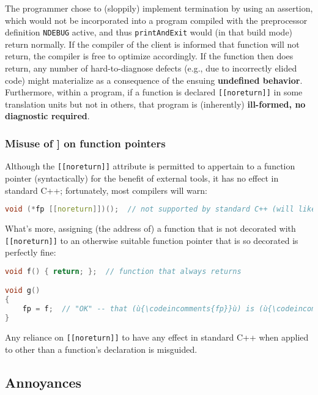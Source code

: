 \noindent The programmer chose to (sloppily) implement termination by using an
assertion, which would not be incorporated into a program compiled with
the preprocessor definition \texttt{NDEBUG} active, and thus
\texttt{printAndExit} would (in that build mode) return normally. If the
compiler of the client is informed that function will not return, the compiler is
free to optimize accordingly. If the function then does return, any
number of hard-to-diagnose defects (e.g., due to incorrectly elided
code) might materialize as a consequence of the ensuing
\textbf{undefined behavior}. Furthermore, within a program, if a function is declared \texttt{[[noreturn]]} in some
translation units but not in others, that program is (inherently)
\textbf{ill-formed, no diagnostic required}.

\subsubsection[Misuse of {\tt[[noreturn]]} on function pointers]{Misuse of {\ParaCode [[noreturn]]} on function pointers}\label{misuse-of-[[noreturn]]-on-function-pointers}

Although the \texttt{[[noreturn]]} attribute is permitted to appertain
to a function pointer (syntactically) for the benefit of external tools,
it has no effect in standard C++; fortunately, most compilers will warn:

\begin{lstlisting}[language=C++]
void (*fp [[noreturn]])();  // not supported by standard C++ (will likely warn)
\end{lstlisting}
    
\noindent What's more, assigning (the address of) a function
that is not decorated with \texttt{[[noreturn]]} to an otherwise
suitable function pointer that is so decorated is perfectly fine:

\begin{lstlisting}[language=C++]
void f() { return; };  // function that always returns

void g()
{
    fp = f;  // "OK" -- that (ù{\codeincomments{fp}}ù) is (ù{\codeincomments{[[noreturn]]}}ù) is silently ignored
}
\end{lstlisting}
    
\noindent Any reliance on \texttt{[[noreturn]]} to have any effect in standard C++
when applied to other than a function's declaration is misguided.

\subsection[Annoyances]{Annoyances}\label{annoyances}

